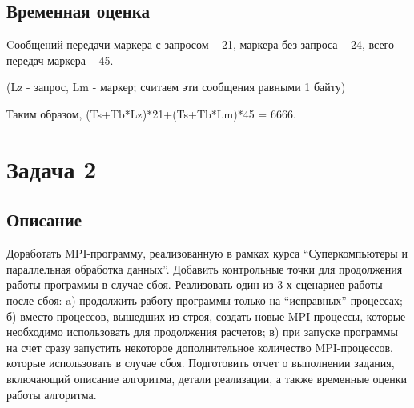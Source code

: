 \documentclass[a4paper,12pt,titlepage,final]{article}
\begin{document}
\subsection{Временная оценка}
Cообщений передачи маркера с запросом – 21, маркера без запроса – 24, всего передач маркера – 45.\par
(Lz - запрос, Lm - маркер; считаем эти сообщения равными 1 байту)\par
Таким образом, (Ts+Tb*Lz)*21+(Ts+Tb*Lm)*45 = 6666.
\newpage
\section{Задача 2}
\subsection{Описание}
Доработать MPI-программу, реализованную в рамках курса “Суперкомпьютеры и параллельная обработка данных”. Добавить контрольные точки для продолжения работы программы в случае сбоя. Реализовать один из 3-х сценариев работы после сбоя: a) продолжить работу программы только на “исправных” процессах; б) вместо процессов, вышедших из строя, создать новые MPI-процессы, которые необходимо использовать для продолжения расчетов; в) при запуске программы на счет сразу запустить некоторое дополнительное количество MPI-процессов, которые использовать в случае сбоя.
Подготовить отчет о выполнении задания, включающий описание алгоритма, детали реализации, а также временные оценки работы алгоритма.
\end{document}
